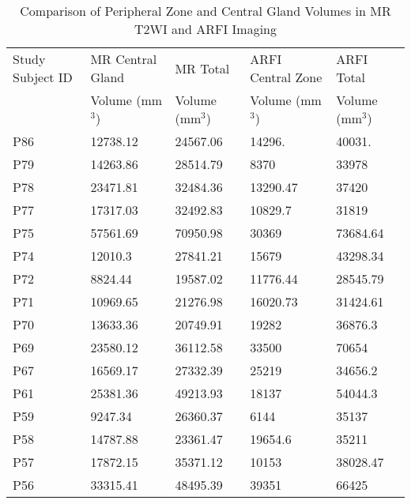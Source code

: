 \begin{table}
\centering
\caption{Comparison of Peripheral Zone and Central Gland Volumes in MR T2WI and ARFI Imaging}
\begin{tabular}{|l|l|l|l|l|} \hline
Study Subject ID & MR Central Gland & MR Total & ARFI Central Zone & ARFI Total \\ 
& Volume (mm$^3$) & Volume (mm$^3$) & Volume (mm$^3$) & Volume (mm$^3$) \\ \hline
P86 & 12738.12 & 24567.06 & 14296. & 40031. \\
P79 & 14263.86 & 28514.79 & 8370 & 33978 \\
P78 & 23471.81 & 32484.36 & 13290.47 & 37420 \\
P77 & 17317.03 & 32492.83 & 10829.7 & 31819 \\
P75 & 57561.69 & 70950.98 & 30369 & 73684.64 \\
P74 & 12010.3 & 27841.21 & 15679 & 43298.34 \\
P72 & 8824.44 & 19587.02 & 11776.44 & 28545.79 \\
P71 & 10969.65 & 21276.98 & 16020.73 & 31424.61 \\
P70 & 13633.36 & 20749.91 & 19282 & 36876.3\\
P69 & 23580.12 & 36112.58 & 33500 & 70654 \\
P67 & 16569.17 & 27332.39 & 25219 & 34656.2 \\
P61 & 25381.36 & 49213.93 & 18137 & 54044.3 \\
P59 & 9247.34 & 26360.37 & 6144 & 35137 \\
P58 & 14787.88 & 23361.47 & 19654.6 & 35211 \\
P57 & 17872.15 & 35371.12 & 10153 & 38028.47 \\
P56 & 33315.41 & 48495.39 & 39351 & 66425 \\ \hline
\end{tabular}
\label{tab:mr_arfi_volumes}
\end{table}
